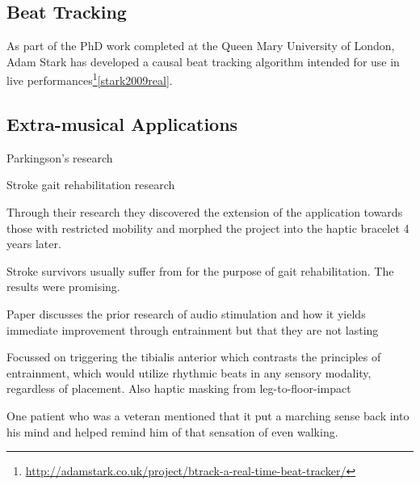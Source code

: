 \subsection{Beat Tracking}
As part of the PhD work completed at the Queen Mary University of London, Adam Stark has developed a causal beat tracking algorithm intended for use in live performances\footnote{\url{http://adamstark.co.uk/project/btrack-a-real-time-beat-tracker/}}\ref{stark2009real}.

\subsection{Extra-musical Applications}

Parkingson's research

Stroke gait rehabilitation research \cite{holland2014gait}

Through their research they discovered the extension of the application towards those with restricted mobility and morphed the project into the haptic bracelet 4 years later.

Stroke survivors usually suffer from  for the purpose of gait rehabilitation. The results were promising. 

Paper discusses the prior research of audio stimulation and how it yields immediate improvement through entrainment but that they are not lasting

Focussed on triggering the tibialis anterior which contrasts the principles of entrainment, which would utilize rhythmic beats in any sensory modality, regardless of placement. Also haptic masking from leg-to-floor-impact

One patient who was a veteran mentioned that it put a marching sense back into his mind and helped remind him of that sensation of even walking.
